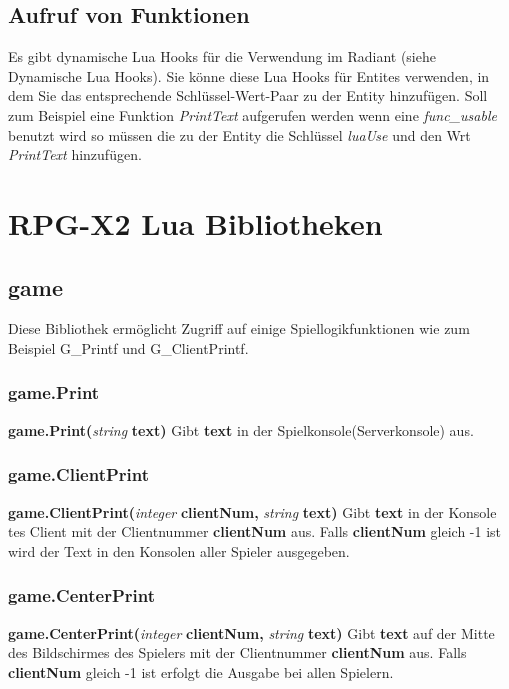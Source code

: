 \documentclass[11pt,a4paper]{book}
\begin{document}
\section{Aufruf von Funktionen}
\label{map-callingfunction}
Es gibt dynamische Lua Hooks für die Verwendung im Radiant (siehe Dynamische Lua Hooks). Sie könne diese Lua Hooks für Entites verwenden, in dem Sie das entsprechende Schlüssel-Wert-Paar zu der Entity hinzufügen.
\newline
Soll zum Beispiel eine Funktion \textit{PrintText} aufgerufen werden wenn eine \textit{func\_usable} benutzt wird so müssen die zu der Entity die Schlüssel \textit{luaUse} und den Wrt \textit{PrintText} hinzufügen.
\newpage
\chapter{RPG-X2 Lua Bibliotheken}
\label{rpgx2-llibs}
\section{game}
\label{g}
Diese Bibliothek ermöglicht Zugriff auf einige Spiellogikfunktionen wie zum Beispiel G\_Printf und G\_ClientPrintf.
\subsection{game.Print}
\label{g-prnt}
\textbf{game.Print(}\textit{string}\textbf{ text)}
\newline
Gibt \textbf{text} in der Spielkonsole(Serverkonsole) aus.
\subsection{game.ClientPrint}
\label{g-clientprint}
\textbf{game.ClientPrint(}\textit{integer}\textbf{ clientNum, }\textit{string}\textbf{ text)}
\newline
Gibt \textbf{text} in der Konsole tes Client mit der Clientnummer \textbf{clientNum} aus. Falls \textbf{clientNum} gleich -1 ist wird der Text in den Konsolen aller Spieler ausgegeben.
\subsection{game.CenterPrint}
\label{g-centerprint}
\textbf{game.CenterPrint(}\textit{integer}\textbf{ clientNum, }\textit{string}\textbf{ text)}
\newline
Gibt \textbf{text} auf der Mitte des Bildschirmes des Spielers mit der Clientnummer \textbf{clientNum} aus. Falls \textbf{clientNum} gleich -1 ist erfolgt die Ausgabe bei allen Spielern.
\end{document}
